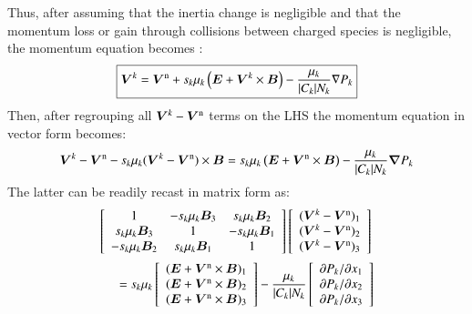 \documentclass{warpdoc}
\newcommand{\alb}{\vspace{0.2cm}\\} %
\newcommand{\mfd}{\displaystyle}
\newcommand\frameeqn[1]{\fbox{$\displaystyle #1$}}
\renewcommand{\vec}[1]{\bm{#1}}
\begin{document}
Thus, after assuming that the inertia change is negligible and that  the momentum loss or gain through collisions between charged species is negligible, the momentum equation becomes \cite{jcp:2011:parent}: 
%
\begin{equation}
\frameeqn{
  \vec{V}^k=\vec{V}^{\rm n} + s_k \mu_k \left(\vec{E}+\vec{V}^k \times \vec{B}\right)-\frac{\mu_k}{|C_k| N_k}\nabla P_k
}
 \label{eqn:Vvector}
\end{equation}
% 
Then, after regrouping all $\vec{V}^k-\vec{V}^{\rm n}$ terms on the LHS the momentum equation in vector form becomes:
%
\begin{equation}
  \vec{V}^{k}-\vec{V}^{\rm n}- s_k \mu_k(\vec{V}^{k}-\vec{V}^{\rm n}) \times \vec{B}=s_k \mu_k \left(\vec{E}  + \vec{V}^{\rm n} \times \vec{B}\right)
             - \frac{\mu_k}{|C_k| N_k} \vec{\nabla}  P_k
\end{equation}
%
The latter can be readily recast in matrix form as:
%
\begin{equation}
 \begin{array}{l}
\mfd
  \left[\begin{array}{ccc} 
      1 & -s_k \mu_k \vec{B}_3  &  s_k \mu_k \vec{B}_2 \\
      s_k \mu_k \vec{B}_3 &  1 &  -s_k \mu_k \vec{B}_1 \\
      -s_k \mu_k \vec{B}_2 &  s_k \mu_k \vec{B}_1 & 1  \\
    \end{array} \right] \left[\begin{array}{c}(\vec{V}^{k}-\vec{V}^{\rm n})_1\\ (\vec{V}^{k}-\vec{V}^{\rm n})_2 \\ (\vec{V}^{k}-\vec{V}^{\rm n})_3\end{array}\right] 
\alb \mfd ~~~~~~
=s_k \mu_k \left[\begin{array}{c}(\vec{E}  + \vec{V}^{\rm n} \times \vec{B})_1 \\ (\vec{E}  + \vec{V}^{\rm n} \times \vec{B})_2 \\ (\vec{E}  + \vec{V}^{\rm n} \times \vec{B})_3\end{array}\right]
             - \frac{\mu_k}{|C_k| N_k} \left[\begin{array}{c} \partial P_k / \partial x_1 \\ \partial P_k / \partial x_2 \\ \partial P_k / \partial x_3 \end{array} \right] 
\end{array}
\end{equation}
\end{document}

